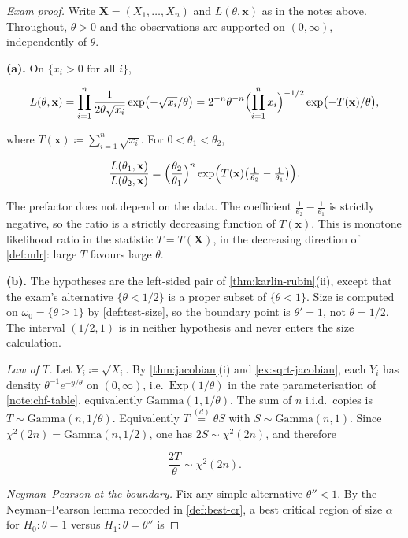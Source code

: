 \documentclass[11pt,a4paper]{article}
\begin{document}
\begin{proof}[Exam proof]
Write \(\mathbf{X}=(X_1,\dots,X_n)\) and \(L(\theta,\mathbf{x})\) as in the notes above. Throughout, \(\theta>0\) and the observations are supported on \((0,\infty)\), independently of \(\theta\).

\textbf{(a).}
On \(\{x_i>0\text{ for all }i\}\),

\[
L(\theta,\mathbf{x})
=
\prod_{i=1}^{n}
\frac{1}{2\theta\sqrt{x_i}}
\exp\bigl(-\sqrt{x_i}/\theta\bigr)
=
2^{-n}\theta^{-n}
\Bigl(\prod_{i=1}^{n}x_i\Bigr)^{-1/2}
\exp\bigl(-T(\mathbf{x})/\theta\bigr),
\]

where \(T(\mathbf{x})\coloneqq\sum_{i=1}^{n}\sqrt{x_i}\). For \(0<\theta_1<\theta_2\),

\[
\frac{L(\theta_1,\mathbf{x})}{L(\theta_2,\mathbf{x})}
=
\Bigl(\frac{\theta_2}{\theta_1}\Bigr)^{n}
\exp\Bigl(T(\mathbf{x})\bigl(\tfrac{1}{\theta_2}-\tfrac{1}{\theta_1}\bigr)\Bigr).
\]

The prefactor does not depend on the data. The coefficient \(\tfrac{1}{\theta_2}-\tfrac{1}{\theta_1}\) is strictly negative, so the ratio is a strictly decreasing function of \(T(\mathbf{x})\). This is monotone likelihood ratio in the statistic \(T=T(\mathbf{X})\), in the decreasing direction of \cref{def:mlr}: large \(T\) favours large \(\theta\).

\textbf{(b).}
The hypotheses are the left-sided pair of \cref{thm:karlin-rubin}(ii), except that the exam's alternative \(\{\theta<1/2\}\) is a proper subset of \(\{\theta<1\}\). Size is computed on \(\omega_0=\{\theta\ge 1\}\) by \cref{def:test-size}, so the boundary point is \(\theta'=1\), not \(\theta=1/2\). The interval \((1/2,1)\) is in neither hypothesis and never enters the size calculation.

\emph{Law of \(T\).}
Let \(Y_i\coloneqq\sqrt{X_i}\). By \cref{thm:jacobian}(i) and \cref{ex:sqrt-jacobian}, each \(Y_i\) has density \(\theta^{-1}e^{-y/\theta}\) on \((0,\infty)\), i.e.\ \(\mathrm{Exp}(1/\theta)\) in the rate parameterisation of \cref{note:chf-table}, equivalently \(\mathrm{Gamma}(1,1/\theta)\). The sum of \(n\) i.i.d.\ copies is \(T\sim\mathrm{Gamma}(n,1/\theta)\). Equivalently \(T\stackrel{(d)}{=}\theta S\) with \(S\sim\mathrm{Gamma}(n,1)\). Since \(\chi^{2}(2n)=\mathrm{Gamma}(n,1/2)\), one has \(2S\sim\chi^{2}(2n)\), and therefore

\[
\frac{2T}{\theta}\sim\chi^{2}(2n).
\]

\emph{Neyman--Pearson at the boundary.}
Fix any simple alternative \(\theta''<1\). By the Neyman--Pearson lemma recorded in \cref{def:best-cr}, a best critical region of size \(\alpha\) for \(H_0:\theta=1\) versus \(H_1:\theta=\theta''\) is


\end{proof}
\end{document}
